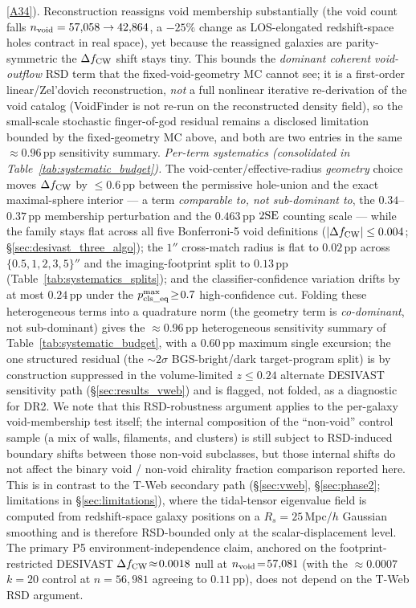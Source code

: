 \documentclass[aps,prd,twocolumn,superscriptaddress,showpacs,preprintnumbers,nofootinbib,longbibliography,floatfix]{revtex4-2}
\newcommand{\repoBase}{https://github.com/Hubify-Projects/bigbounce/blob/main}
\begin{document}
\href{\repoBase/pipelines/p5\_desi\_chirality/scripts/27\_rsd\_void\_recon\_bound.py}{[A34]}).
Reconstruction reassigns void membership substantially (the void count
falls $n_{\rm void}=57{,}058\to42{,}864$, a ${-}25\%$ change as
LOS-elongated redshift-space holes contract in real space), yet because
the reassigned galaxies are parity-symmetric the $\Delta f_{\rm CW}$
shift stays tiny.
This bounds the \emph{dominant coherent void-outflow} RSD term that the
fixed-void-geometry MC cannot see; it is a first-order linear/Zel'dovich
reconstruction, \emph{not} a full nonlinear iterative re-derivation of
the void catalog (VoidFinder is not re-run on the reconstructed density
field), so the small-scale stochastic finger-of-god residual remains a
disclosed limitation bounded by the fixed-geometry MC above, and both
are two entries in the same ${\approx}0.96$\,pp sensitivity summary.
\emph{Per-term systematics (consolidated in
Table~\ref{tab:systematic_budget}).} The void-center/effective-radius
\emph{geometry} choice moves $\Delta f_{\rm CW}$ by $\le 0.6$\,pp between
the permissive hole-union and the exact maximal-sphere interior --- a
term \emph{comparable to, not sub-dominant to}, the
$0.34$--$0.37$\,pp membership perturbation and the $0.463$\,pp $2{\rm SE}$ counting scale
--- while the family stays flat across all five Bonferroni-5 void
definitions ($|\Delta f_{\rm CW}| \le 0.004$;
\S\ref{sec:desivast_three_algo}); the $1''$ cross-match radius is flat to
$0.02$\,pp across $\{0.5,1,2,3,5\}''$ and the imaging-footprint split to
$0.13$\,pp (Table~\ref{tab:systematics_splits}); and the
classifier-confidence variation drifts by at most $0.24$\,pp under the
$p_{\rm cls\_eq}^{\max}\!\ge\!0.7$ high-confidence cut. Folding these
heterogeneous terms into a quadrature norm (the geometry term is
\emph{co-dominant}, not sub-dominant) gives the ${\approx}0.96$\,pp
heterogeneous sensitivity summary of Table~\ref{tab:systematic_budget}, with a
$0.60$\,pp maximum single excursion; the one
structured residual (the ${\sim}2\sigma$ BGS-bright/dark target-program
split) is by construction suppressed in the volume-limited $z\!\le\!0.24$
alternate DESIVAST sensitivity path (\S\ref{sec:results_vweb}) and is flagged, not folded,
as a diagnostic for DR2. We note that
this RSD-robustness argument applies to the per-galaxy void-membership
test itself; the internal composition of the ``non-void'' control
sample (a mix of walls, filaments, and clusters) is still subject to
RSD-induced boundary shifts between those non-void subclasses, but
those internal shifts do not affect the binary void / non-void
chirality fraction comparison reported here. This is in contrast to the T-Web secondary
path (\S\ref{sec:vweb}, \S\ref{sec:phase2}; limitations in
\S\ref{sec:limitations}), where the tidal-tensor eigenvalue
field is computed from redshift-space galaxy positions on a
$R_s\!=\!25$\,Mpc/$h$ Gaussian smoothing and is therefore
RSD-bounded only at the scalar-displacement level. The primary
P5 environment-independence claim, anchored on the footprint-restricted
DESIVAST $\Delta f_{\rm CW}\!\approx\!0.0018$ null at
$n_{\rm void}\!=\!57{,}081$ (with the $\approx\!0.0007$ $k\!=\!20$
control at $n\!=\!56{,}981$ agreeing to $0.11$\,pp), does not depend on
the T-Web RSD argument.
\end{document}
